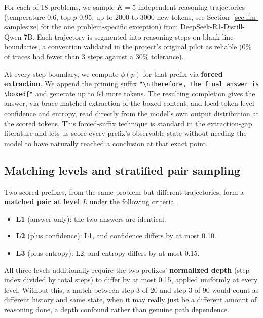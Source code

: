 \documentclass{article}
\begin{document}
For each of 18 problems, we sample $K=5$ independent reasoning trajectories (temperature 0.6, top-$p$ 0.95, up to 2000 to 3000 new tokens, see Section~\ref{sec:lim-samplesize} for the one problem-specific exception) from DeepSeek-R1-Distill-Qwen-7B. Each trajectory is segmented into reasoning steps on blank-line boundaries, a convention validated in the project's original pilot as reliable (0\% of traces had fewer than 3 steps against a 30\% tolerance).

At every step boundary, we compute $\phi(p)$ for that prefix via \textbf{forced extraction}. We append the priming suffix \texttt{"\textbackslash nTherefore, the final answer is \textbackslash boxed\{"} and generate up to 64 more tokens. The resulting completion gives the answer, via brace-matched extraction of the boxed content, and local token-level confidence and entropy, read directly from the model's own output distribution at the scored tokens. This forced-suffix technique is standard in the extraction-gap literature and lets us score every prefix's observable state without needing the model to have naturally reached a conclusion at that exact point.

\subsection{Matching levels and stratified pair sampling}
\label{sec:method-matching}

Two scored prefixes, from the same problem but different trajectories, form a \textbf{matched pair at level $L$} under the following criteria.

\begin{itemize}
  \item \textbf{L1} (answer only): the two answers are identical.
  \item \textbf{L2} (plus confidence): L1, and confidence differs by at most 0.10.
  \item \textbf{L3} (plus entropy): L2, and entropy differs by at most 0.15.
\end{itemize}

All three levels additionally require the two prefixes' \textbf{normalized depth} (step index divided by total steps) to differ by at most 0.15, applied uniformly at every level. Without this, a match between step 3 of 20 and step 3 of 90 would count as different history and same state, when it may really just be a different amount of reasoning done, a depth confound rather than genuine path dependence.
\end{document}
